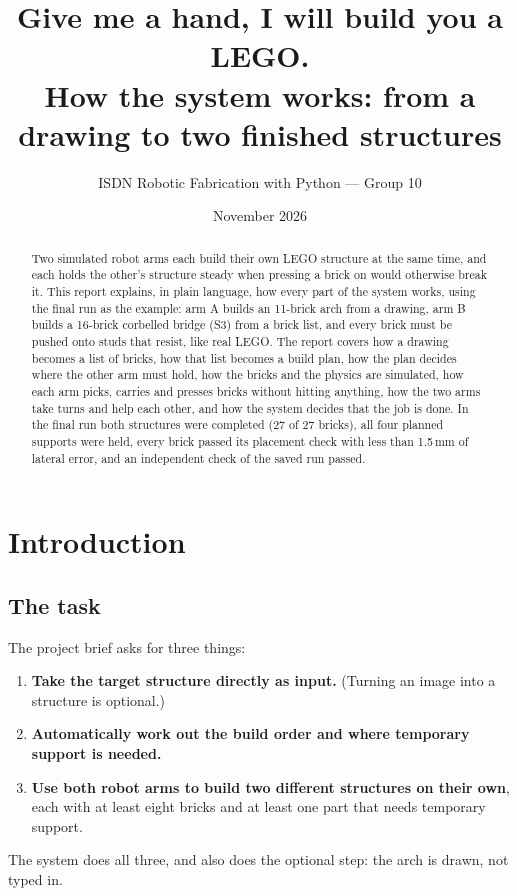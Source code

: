 \documentclass[11pt,a4paper]{article}
\title{\textbf{Give me a hand, I will build you a LEGO.}\\[4pt]
\large How the system works: from a drawing to two finished structures}
\author{ISDN Robotic Fabrication with Python --- Group 10}
\date{November 2026}
\begin{document}
\maketitle

\begin{abstract}
Two simulated robot arms each build their own LEGO structure at the same time,
and each holds the other's structure steady when pressing a brick on would
otherwise break it. This report explains, in plain language, how every part
of the system works, using the final run as the example: arm A builds an
11-brick arch from a drawing, arm B builds a 16-brick corbelled bridge (S3)
from a brick list, and every brick must be pushed onto studs that resist,
like real LEGO. The report covers how a drawing becomes a list of bricks, how
that list becomes a build plan, how the plan decides where the other arm must
hold, how the bricks and the physics are simulated, how each arm picks, carries
and presses bricks without hitting anything, how the two arms take turns and
help each other, and how the system decides that the job is done. In the final
run both structures were completed (27 of 27 bricks), all four planned
supports were held, every brick passed its placement check with less than
1.5\,mm of lateral error, and an independent check of the saved run passed.
\end{abstract}

\tableofcontents
\newpage

\section{Introduction}

\subsection{The task}

The project brief asks for three things:
\begin{enumerate}
\item \textbf{Take the target structure directly as input.} (Turning an image into a structure is optional.)
\item \textbf{Automatically work out the build order and where temporary support is needed.}
\item \textbf{Use both robot arms to build two different structures on their own}, each with at
      least eight bricks and at least one part that needs temporary support.
\end{enumerate}
The system does all three, and also does the optional step: the arch is drawn,
not typed in.
\end{document}
